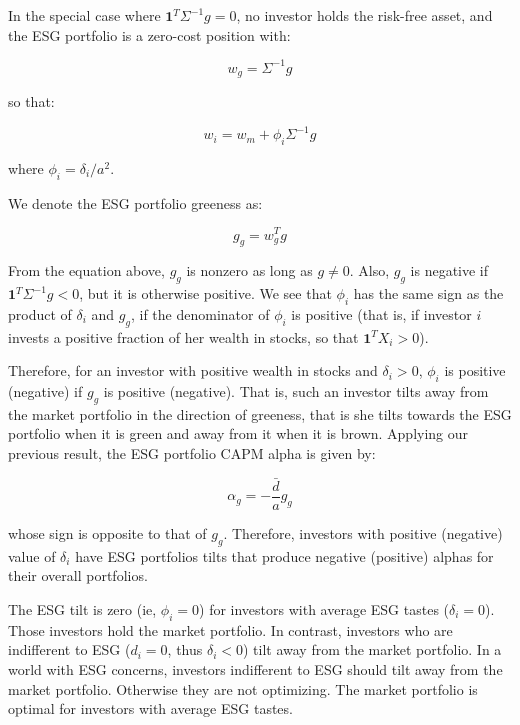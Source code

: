 In the special case where $\mathbf{1}^T \Sigma^{-1} g = 0$,
no investor holds the risk-free asset, and the ESG 
portfolio is a zero-cost position with:

\begin{equation}
    w_g = \Sigma^{-1} g
\end{equation}

so that: 

\begin{equation}
    w_i = w_m + \phi_i \Sigma^{-1} g
\end{equation}

where $\phi_i = \delta_i / a^2$.    

We denote the ESG portfolio greeness as: 

\begin{equation}
    g_g = w_g^T g 
\end{equation}

From the equation above, $g_g$ is nonzero as long as 
$g \neq 0$. Also, 
$g_g$ is negative if $\mathbf{1}^T \Sigma^{-1} g < 0$,
but it is otherwise positive. We see that $\phi_i$ 
has the same sign as the product of $\delta_i$ and $g_g$,
if the denominator of $\phi_i$ is positive (that is, 
if investor $i$ invests a positive fraction 
of her wealth in stocks, so that $\mathbf{1}^T X_i > 0$).

Therefore, for an investor with positive wealth 
in stocks and $\delta_i > 0$, $\phi_i$ is positive 
(negative) if $g_g$ is positive (negative).
That is, such an investor tilts away from 
the market portfolio in the direction of greeness,
that is she tilts towards the ESG portfolio 
when it is green and away from it when it is brown.
Applying our previous result, the 
ESG portfolio CAPM alpha is given by: 

\begin{equation}
    \alpha_g = - \frac{\bar{d}}{a} g_g
\end{equation}

whose sign is opposite to that of $g_g$. Therefore, 
investors with positive (negative) value of $\delta_i$
have ESG portfolios tilts that produce 
negative (positive) alphas for their overall portfolios.

The ESG tilt is zero (ie, $\phi_i = 0$) for 
investors with average ESG tastes ($\delta_i = 0$).
Those investors hold the market portfolio. In contrast,
investors who are indifferent to ESG ($d_i = 0$, thus 
$\delta_i < 0$) tilt away from the market portfolio.
In a world with ESG concerns, investors indifferent 
to ESG should tilt away from the market portfolio.
Otherwise they are not optimizing. The market portfolio
is optimal for investors with average ESG tastes.


